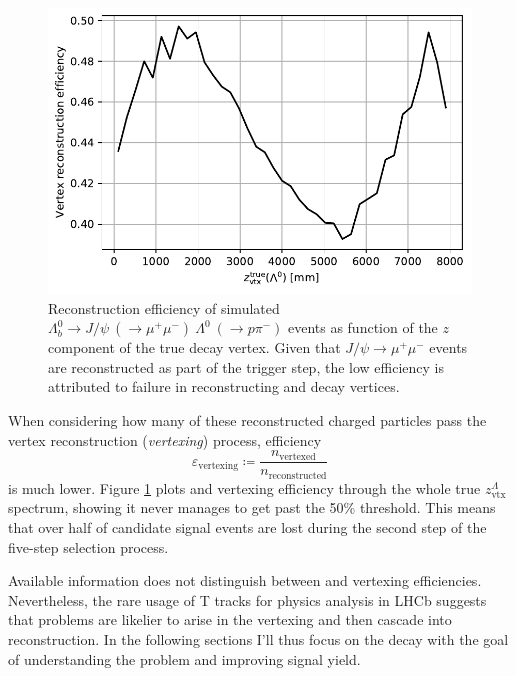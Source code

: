 \begin{figure}[t!]
	\centering
	\includegraphics[width=.6\textwidth]{graphics/03-vertex_reconstruction/lambda_lambdab_reco_efficiency.pdf}
	\caption[A]{Reconstruction efficiency of simulated $\Lambda^0_b \rightarrow J/\psi~(\rightarrow \mu^+\mu^-)~\Lambda^0~(\rightarrow p\pi^-)$ events as function of the $z$ component of the true \lz decay vertex. Given that $J/\psi \rightarrow \mu^+ \mu^-$ events are reconstructed as part of the trigger step, the low efficiency is attributed to failure in reconstructing \lz and \lbz decay vertices.}
	\label{fig:lambda_lambdab_reco_efficiency}
\end{figure}

When considering how many of these reconstructed charged particles pass the vertex reconstruction (\textit{vertexing}) process, efficiency
\begin{equation}
	\varepsilon_\text{vertexing} \coloneqq \frac{n_\text{vertexed}}{n_\text{reconstructed}}
\end{equation}
is much lower.
Figure \ref{fig:lambda_lambdab_reco_efficiency} plots \lbz and \lz vertexing efficiency through the whole true $z_\text{vtx}^\Lambda$ spectrum, showing it never manages to get past the 50\% threshold.
This means that over half of candidate signal events are lost during the second step of the five-step selection process.

Available information does not distinguish between \demonstratorshort and \lambdadecay vertexing efficiencies.
Nevertheless, the rare usage of T tracks for physics analysis in LHCb suggests that problems are likelier to arise in the \lambdadecay vertexing and then cascade into \demonstratorshort reconstruction.
In the following sections I'll thus focus on the \lambdadecay decay with the goal of understanding the problem and improving signal yield.


